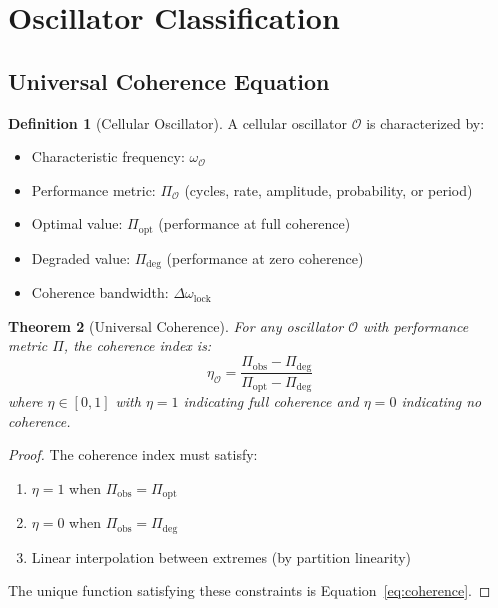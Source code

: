 \documentclass[10pt,twocolumn]{article}
\theoremstyle{plain}
\newtheorem{theorem}{Theorem}[section]
\theoremstyle{definition}
\newtheorem{definition}[theorem]{Definition}
\theoremstyle{remark}
\newcommand{\omegalock}{\Delta\omega_{\mathrm{lock}}}
\begin{document}
\section{Oscillator Classification}
\label{sec:oscillators}

\subsection{Universal Coherence Equation}

\begin{definition}[Cellular Oscillator]
\label{def:oscillator}
A cellular oscillator $\mathcal{O}$ is characterized by:
\begin{itemize}
\item Characteristic frequency: $\omega_{\mathcal{O}}$
\item Performance metric: $\Pi_{\mathcal{O}}$ (cycles, rate, amplitude, probability, or period)
\item Optimal value: $\Pi_{\mathrm{opt}}$ (performance at full coherence)
\item Degraded value: $\Pi_{\mathrm{deg}}$ (performance at zero coherence)
\item Coherence bandwidth: $\omegalock$
\end{itemize}
\end{definition}

\begin{theorem}[Universal Coherence]
\label{thm:universal_coherence}
For any oscillator $\mathcal{O}$ with performance metric $\Pi$, the coherence index is:
\begin{equation}
\eta_{\mathcal{O}} = \frac{\Pi_{\mathrm{obs}} - \Pi_{\mathrm{deg}}}{\Pi_{\mathrm{opt}} - \Pi_{\mathrm{deg}}}
\label{eq:coherence}
\end{equation}
where $\eta \in [0,1]$ with $\eta = 1$ indicating full coherence and $\eta = 0$ indicating no coherence.
\end{theorem}

\begin{proof}
The coherence index must satisfy:
\begin{enumerate}[label=(\roman*)]
\item $\eta = 1$ when $\Pi_{\mathrm{obs}} = \Pi_{\mathrm{opt}}$
\item $\eta = 0$ when $\Pi_{\mathrm{obs}} = \Pi_{\mathrm{deg}}$
\item Linear interpolation between extremes (by partition linearity)
\end{enumerate}
The unique function satisfying these constraints is Equation~\eqref{eq:coherence}.
\end{proof}
\end{document}
